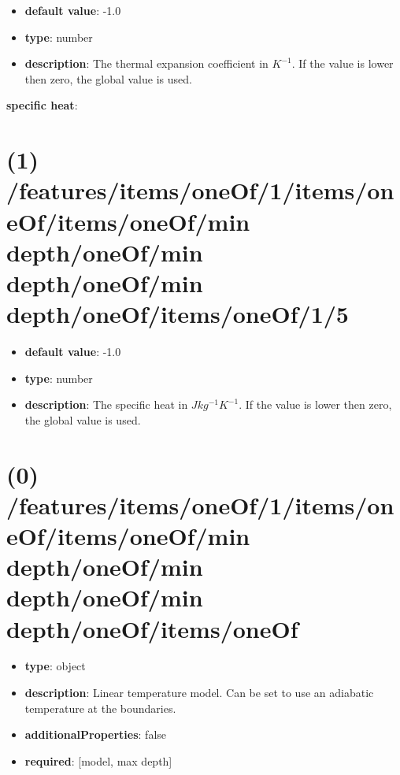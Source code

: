 \begin{itemize}[leftmargin=1em]\item {\bf default value}: -1.0
\item {\bf type}: number
\item {\bf description}: The thermal expansion coefficient in $K^{-1}$. If the value is lower then zero, the global value is used.
\end{itemize}\item {\bf specific heat}: \section{(1) /features/items/oneOf/1/items/oneOf/items/oneOf/min depth/oneOf/min depth/oneOf/min depth/oneOf/items/oneOf/1/5}
\begin{itemize}[leftmargin=1em]\item {\bf default value}: -1.0
\item {\bf type}: number
\item {\bf description}: The specific heat in $J kg^{-1} K^{-1}$. If the value is lower then zero, the global value is used.
\end{itemize}\section{(0) /features/items/oneOf/1/items/oneOf/items/oneOf/min depth/oneOf/min depth/oneOf/min depth/oneOf/items/oneOf}
\begin{itemize}[leftmargin=0em]\item {\bf type}: object
\item {\bf description}: Linear temperature model. Can be set to use an adiabatic temperature at the boundaries.
\item {\bf additionalProperties}: false
\item {\bf required}: [model, max depth]\end{itemize}
